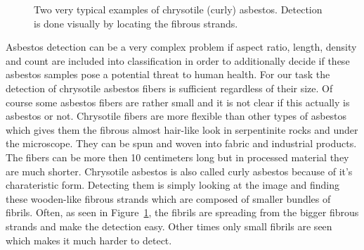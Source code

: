 \begin{figure}[h]
\centering
\caption{Two very typical examples of chrysotile (curly) asbestos. Detection is done visually by locating the fibrous strands.}
\label{fig:chrysotile_classification}
\end{figure}

Asbestos detection can be a very complex problem if  aspect ratio, length, density and count are included into classification in order to additionally decide if these asbestos samples pose a potential threat to human health. For our task the detection of chrysotile asbestos fibers is sufficient regardless of their size. Of course some asbestos fibers are rather small and it is not clear if this actually is asbestos or not. Chrysotile fibers are more flexible than  other types of asbestos which gives them the fibrous almost hair-like look in serpentinite rocks and under the microscope. They can be spun and woven into fabric and industrial products. The fibers can be more then 10 centimeters  long but in processed material they are much shorter. Chrysotile asbestos is also called curly asbestos because of it's charateristic form. Detecting  them is simply looking at the image and finding these wooden-like fibrous strands which are composed of smaller bundles of fibrils. Often, as  seen in Figure~\ref{fig:chrysotile_classification}, the fibrils are spreading  from the bigger fibrous strands and make the detection easy. Other times only small fibrils are seen which makes it much harder to detect.

